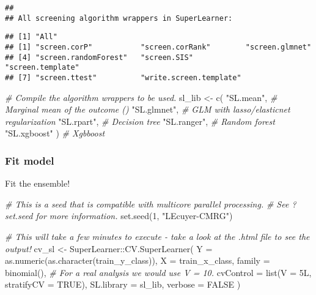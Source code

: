 \documentclass[
]{book}
\newenvironment{Shaded}{\begin{snugshade}}{\end{snugshade}}
\newcommand{\AttributeTok}[1]{\textcolor[rgb]{0.77,0.63,0.00}{#1}}
\newcommand{\CommentTok}[1]{\textcolor[rgb]{0.56,0.35,0.01}{\textit{#1}}}
\newcommand{\ConstantTok}[1]{\textcolor[rgb]{0.00,0.00,0.00}{#1}}
\newcommand{\DecValTok}[1]{\textcolor[rgb]{0.00,0.00,0.81}{#1}}
\newcommand{\FunctionTok}[1]{\textcolor[rgb]{0.00,0.00,0.00}{#1}}
\newcommand{\NormalTok}[1]{#1}
\newcommand{\OtherTok}[1]{\textcolor[rgb]{0.56,0.35,0.01}{#1}}
\newcommand{\SpecialCharTok}[1]{\textcolor[rgb]{0.00,0.00,0.00}{#1}}
\newcommand{\StringTok}[1]{\textcolor[rgb]{0.31,0.60,0.02}{#1}}
\begin{document}
\begin{verbatim}
## 
## All screening algorithm wrappers in SuperLearner:
\end{verbatim}

\begin{verbatim}
## [1] "All"
## [1] "screen.corP"           "screen.corRank"        "screen.glmnet"        
## [4] "screen.randomForest"   "screen.SIS"            "screen.template"      
## [7] "screen.ttest"          "write.screen.template"
\end{verbatim}

\begin{Shaded}
\begin{Highlighting}[]
\CommentTok{\# Compile the algorithm wrappers to be used.}
\NormalTok{sl\_lib }\OtherTok{\textless{}{-}} \FunctionTok{c}\NormalTok{(}
  \StringTok{"SL.mean"}\NormalTok{, }\CommentTok{\# Marginal mean of the outcome ()}
  \StringTok{"SL.glmnet"}\NormalTok{, }\CommentTok{\# GLM with lasso/elasticnet regularization}
  \StringTok{"SL.rpart"}\NormalTok{, }\CommentTok{\# Decision tree}
  \StringTok{"SL.ranger"}\NormalTok{, }\CommentTok{\# Random forest}
  \StringTok{"SL.xgboost"}
\NormalTok{) }\CommentTok{\# Xgbboost}
\end{Highlighting}
\end{Shaded}

\hypertarget{fit-model}{%
\subsubsection{Fit model}\label{fit-model}}

Fit the ensemble!

\begin{Shaded}
\begin{Highlighting}[]
\CommentTok{\# This is a seed that is compatible with multicore parallel processing.}
\CommentTok{\# See ?set.seed for more information.}
\FunctionTok{set.seed}\NormalTok{(}\DecValTok{1}\NormalTok{, }\StringTok{"L\textquotesingle{}Ecuyer{-}CMRG"}\NormalTok{)}

\CommentTok{\# This will take a few minutes to execute {-} take a look at the .html file to see the output!}
\NormalTok{cv\_sl }\OtherTok{\textless{}{-}}\NormalTok{ SuperLearner}\SpecialCharTok{::}\FunctionTok{CV.SuperLearner}\NormalTok{(}
  \AttributeTok{Y =} \FunctionTok{as.numeric}\NormalTok{(}\FunctionTok{as.character}\NormalTok{(train\_y\_class)),}
  \AttributeTok{X =}\NormalTok{ train\_x\_class,}
  \AttributeTok{family =} \FunctionTok{binomial}\NormalTok{(),}
  \CommentTok{\# For a real analysis we would use V = 10.}
  \AttributeTok{cvControl =} \FunctionTok{list}\NormalTok{(}\AttributeTok{V =}\NormalTok{ 5L, }\AttributeTok{stratifyCV =} \ConstantTok{TRUE}\NormalTok{),}
  \AttributeTok{SL.library =}\NormalTok{ sl\_lib,}
  \AttributeTok{verbose =} \ConstantTok{FALSE}
\NormalTok{)}
\end{Highlighting}
\end{Shaded}
\end{document}
